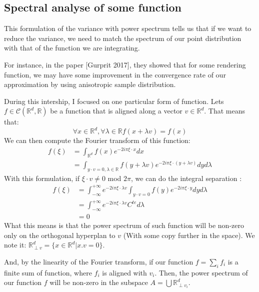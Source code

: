 \documentclass{classeENS}
\begin{document}
\subsection{Spectral analyse of some function}

\> This formulation of the variance with power spectrum tells us 
    that if we want to reduce the variance, we need to match the 
    spectrum of our point distribution with that of the function 
    we are integrating.

\> For instance, in the paper [Gurprit 2017], they showed that for 
    some rendering function, we may have some improvement in the 
    convergence rate of our approximation by using anisotropic 
    sample distribution.

\> During this intership, I focused on one particular form of function.
    Lets $f\in\mathcal C(\mathbb R^d,\mathbb R)$ be a function that 
    is aligned along a vector $v \in \mathbb R^d$. That means that:
    \[ \forall x\in\mathbb R^d, \forall \lambda\in\mathbb R f(x+\lambda v) = f(x) \]
    We can then compute the Fourier transform of this function:
    \begin{align*}
        f(\xi) &= \int_{\mathbb R^d} f(x) e^{-2i\pi \xi\cdot x} dx \\
               &= \int_{y\cdot v=0, \lambda \in \mathbb R } f(y+\lambda v) 
                                    e^{-2i\pi \xi\cdot (y+\lambda v)} dy d\lambda
    \end{align*}
    With this formulation, if $\xi \cdot v \neq 0$ mod $2\pi$, we can do the integral separation : \begin{align*}
        f(\xi) &= \int_{-\infty}^{+\infty} e^{-2i\pi 
            \xi\cdot\lambda v} \int_{y\cdot v=0} f(y) e^{-2i\pi \xi\cdot y}  dy d\lambda \\
            &= \int_{-\infty}^{+\infty} e^{-2i\pi 
            \xi\cdot\lambda v} C^{te} d\lambda \\
            &= 0
    \end{align*}
    What this means is that the power spectrum of such function will be non-zero only on
    the orthogonal hyperplan to $v$ (With some copy further in the space). We note it: 
    $\mathbb R^d_{\perp v} = \{x \in \mathbb R^d | x.v = 0\}$.

\> And, by the linearity of the Fourier transform, if our function $f = \sum_i f_i$ is a finite sum 
    of function, where $f_i$ is aligned with $v_i$. Then, the power spectrum 
    of our function $f$ will be non-zero in the subspace 
    $A = \bigcup \mathbb R^d_{\perp v_i}$.
\end{document}
